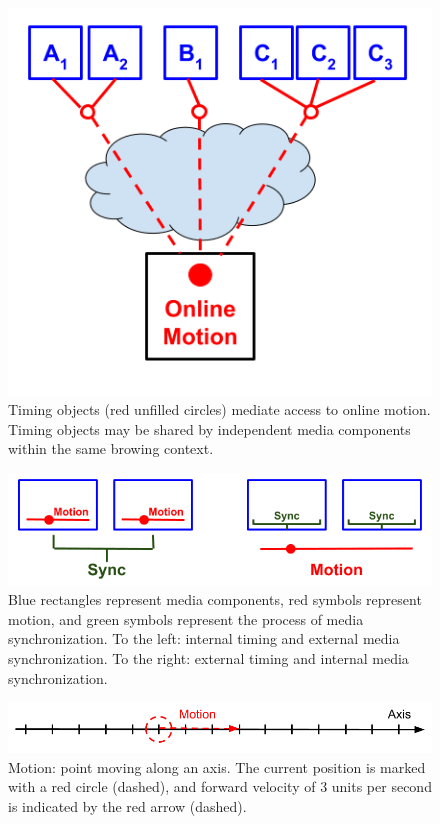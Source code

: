 \documentclass[graybox]{svmult}
\begin{document}
\begin{figure}[h]
\centering
\includegraphics[scale=.4]{fig/motion-model-2.png}
\caption{Timing objects (red unfilled circles) mediate access to online motion. Timing objects may be shared by independent media components within the same browing context.}
\label{fig:model-2}
\end{figure}

\begin{figure}[h]
\centering
\includegraphics[scale=.4]{fig/internal-external.png}
\caption{
  Blue rectangles represent media components, red symbols represent motion, and green symbols represent the process of media synchronization. To the left: internal timing and external media synchronization. To the right: external timing and internal media synchronization.
}
\label{fig:internalexternal}
\end{figure}


\begin{figure}[h]
\centering
\includegraphics[scale=.4]{fig/motion-axis.png}
\caption{Motion: point moving along an axis. The current position
is marked with a red circle (dashed), and forward velocity of 3 units per second is
indicated by the red arrow (dashed).}
\label{fig:motion}
\end{figure}
\end{document}

